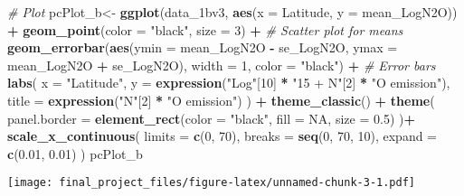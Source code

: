 \documentclass[
]{article}
\newenvironment{Shaded}{\begin{snugshade}}{\end{snugshade}}
\newcommand{\AttributeTok}[1]{\textcolor[rgb]{0.13,0.29,0.53}{#1}}
\newcommand{\CommentTok}[1]{\textcolor[rgb]{0.56,0.35,0.01}{\textit{#1}}}
\newcommand{\ConstantTok}[1]{\textcolor[rgb]{0.56,0.35,0.01}{#1}}
\newcommand{\DecValTok}[1]{\textcolor[rgb]{0.00,0.00,0.81}{#1}}
\newcommand{\FloatTok}[1]{\textcolor[rgb]{0.00,0.00,0.81}{#1}}
\newcommand{\FunctionTok}[1]{\textcolor[rgb]{0.13,0.29,0.53}{\textbf{#1}}}
\newcommand{\NormalTok}[1]{#1}
\newcommand{\OtherTok}[1]{\textcolor[rgb]{0.56,0.35,0.01}{#1}}
\newcommand{\SpecialCharTok}[1]{\textcolor[rgb]{0.81,0.36,0.00}{\textbf{#1}}}
\newcommand{\StringTok}[1]{\textcolor[rgb]{0.31,0.60,0.02}{#1}}
\begin{document}
\begin{Shaded}
\begin{Highlighting}[]
\CommentTok{\# Plot}
\NormalTok{pcPlot\_b}\OtherTok{\textless{}{-}} \FunctionTok{ggplot}\NormalTok{(data\_1bv3, }\FunctionTok{aes}\NormalTok{(}\AttributeTok{x =}\NormalTok{ Latitude, }\AttributeTok{y =}\NormalTok{ mean\_LogN2O)) }\SpecialCharTok{+}
  \FunctionTok{geom\_point}\NormalTok{(}\AttributeTok{color =} \StringTok{"black"}\NormalTok{, }\AttributeTok{size =} \DecValTok{3}\NormalTok{) }\SpecialCharTok{+}  \CommentTok{\# Scatter plot for means}
  \FunctionTok{geom\_errorbar}\NormalTok{(}\FunctionTok{aes}\NormalTok{(}\AttributeTok{ymin =}\NormalTok{ mean\_LogN2O }\SpecialCharTok{{-}}\NormalTok{ se\_LogN2O, }\AttributeTok{ymax =}\NormalTok{ mean\_LogN2O }\SpecialCharTok{+}\NormalTok{ se\_LogN2O), }
                \AttributeTok{width =} \DecValTok{1}\NormalTok{, }\AttributeTok{color =} \StringTok{"black"}\NormalTok{) }\SpecialCharTok{+}  \CommentTok{\# Error bars}
  \FunctionTok{labs}\NormalTok{(}
    \AttributeTok{x =} \StringTok{"Latitude"}\NormalTok{, }
    \AttributeTok{y =} \FunctionTok{expression}\NormalTok{(}\StringTok{"Log"}\NormalTok{[}\DecValTok{10}\NormalTok{] }\SpecialCharTok{*} \StringTok{"15 + N"}\NormalTok{[}\DecValTok{2}\NormalTok{] }\SpecialCharTok{*} \StringTok{"O emission"}\NormalTok{), }
    \AttributeTok{title =} \FunctionTok{expression}\NormalTok{(}\StringTok{"N"}\NormalTok{[}\DecValTok{2}\NormalTok{] }\SpecialCharTok{*} \StringTok{"O emission"}\NormalTok{)}
\NormalTok{  ) }\SpecialCharTok{+}
  \FunctionTok{theme\_classic}\NormalTok{() }\SpecialCharTok{+}
  \FunctionTok{theme}\NormalTok{(}
    \AttributeTok{panel.border =} \FunctionTok{element\_rect}\NormalTok{(}\AttributeTok{color =} \StringTok{"black"}\NormalTok{, }\AttributeTok{fill =} \ConstantTok{NA}\NormalTok{, }\AttributeTok{size =} \FloatTok{0.5}\NormalTok{)}
\NormalTok{  )}\SpecialCharTok{+}
  \FunctionTok{scale\_x\_continuous}\NormalTok{(}
    \AttributeTok{limits =} \FunctionTok{c}\NormalTok{(}\DecValTok{0}\NormalTok{, }\DecValTok{70}\NormalTok{),      }
    \AttributeTok{breaks =} \FunctionTok{seq}\NormalTok{(}\DecValTok{0}\NormalTok{, }\DecValTok{70}\NormalTok{, }\DecValTok{10}\NormalTok{),}
    \AttributeTok{expand =} \FunctionTok{c}\NormalTok{(}\FloatTok{0.01}\NormalTok{, }\FloatTok{0.01}\NormalTok{)}
\NormalTok{    )}
\NormalTok{pcPlot\_b}
\end{Highlighting}
\end{Shaded}

\texttt{[image: final\_project\_files/figure-latex/unnamed-chunk-3-1.pdf]}
\end{document}

